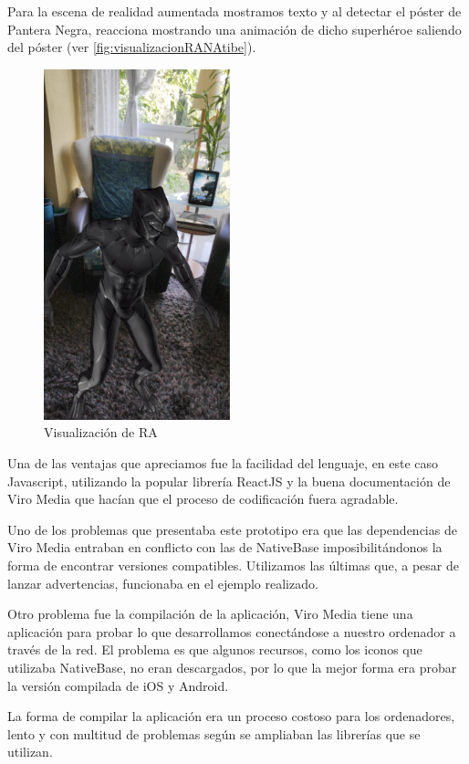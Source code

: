 Para la escena de realidad aumentada mostramos texto y al detectar el póster de Pantera Negra,
reacciona mostrando una animación de dicho superhéroe saliendo del póster (ver \autoref{fig:visualizacionRANAtibe}).
 
\begin{figure}[H]
    \centering
    \includegraphics[height=4in]{figures/chapter-3/viromedia/blackpanther.png}
    \caption{Visualización de RA}
    \label{fig:visualizacionRANAtibe}
\end{figure}
Una de las ventajas que apreciamos fue la facilidad del lenguaje, en este caso Javascript,
 utilizando la popular librería ReactJS y la buena documentación de Viro Media
 que hacían que el proceso de codificación fuera agradable.

Uno de los problemas que presentaba este prototipo era que las dependencias de
 Viro Media entraban en conflicto con las de NativeBase
 imposibilitándonos la forma de encontrar versiones compatibles. Utilizamos las últimas que, a pesar de lanzar
 advertencias, funcionaba en el ejemplo realizado.

Otro problema fue la compilación de la aplicación, Viro Media tiene una aplicación para probar lo
 que desarrollamos conectándose a nuestro ordenador a través de la red. El problema es
 que algunos recursos, como los iconos que utilizaba NativeBase, no eran descargados, por lo que la
 mejor forma era probar la versión compilada de iOS y Android.
 
 La forma de compilar la aplicación era un proceso costoso para los ordenadores,
 lento y con multitud de problemas según se ampliaban las librerías que se utilizan.

